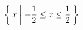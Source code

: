 \documentclass{ltjsarticle}
\begin{document}
\[ \Set{ x | -\frac{1}{2} \leq x \leq \frac{1}{2} } \]
\end{document}
